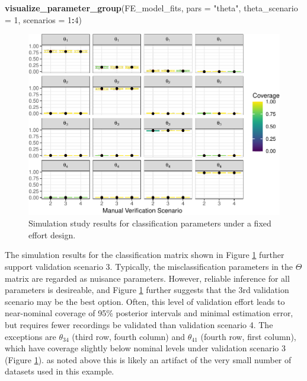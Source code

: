 \documentclass[
]{article}
\newenvironment{Shaded}{\begin{snugshade}}{\end{snugshade}}
\newcommand{\AttributeTok}[1]{\textcolor[rgb]{0.13,0.29,0.53}{#1}}
\newcommand{\DecValTok}[1]{\textcolor[rgb]{0.00,0.00,0.81}{#1}}
\newcommand{\FunctionTok}[1]{\textcolor[rgb]{0.13,0.29,0.53}{\textbf{#1}}}
\newcommand{\NormalTok}[1]{#1}
\newcommand{\SpecialCharTok}[1]{\textcolor[rgb]{0.81,0.36,0.00}{\textbf{#1}}}
\newcommand{\StringTok}[1]{\textcolor[rgb]{0.31,0.60,0.02}{#1}}
\begin{document}
\linespread{1}

\begin{Shaded}
\begin{Highlighting}[]
\FunctionTok{visualize\_parameter\_group}\NormalTok{(FE\_model\_fits, }\AttributeTok{pars =} \StringTok{"theta"}\NormalTok{, }\AttributeTok{theta\_scenario =} \DecValTok{1}\NormalTok{, }\AttributeTok{scenarios =} \DecValTok{1}\SpecialCharTok{:}\DecValTok{4}\NormalTok{)}
\end{Highlighting}
\end{Shaded}

\begin{figure}
\centering
\includegraphics{Vignette_files/figure-latex/FEtheta-1.pdf}
\caption{\label{fig:FEtheta}Simulation study results for classification parameters under a fixed effort design.}
\end{figure}

\linespread{1}

The simulation results for the classification matrix shown in Figure \ref{fig:FEtheta} further support validation scenario 3. Typically, the misclassification parameters in the \(\Theta\) matrix are regarded as nuisance parameters. However, reliable inference for all parameters is desireable, and Figure \ref{fig:FEtheta} further suggests that the 3rd validation scenario may be the best option. Often, this level of validation effort leads to near-nominal coverage of 95\% posterior intervals and minimal estimation error, but requires fewer recordings be validated than validation scenario 4. The exceptions are \(\theta_{34}\) (third row, fourth column) and \(\theta_{41}\) (fourth row, first column), which have coverage slightly below nominal levels under validation scenario 3 (Figure \ref{fig:FEtheta}). as noted above this is likely an artifact of the very small number of datasets used in this example.
\end{document}
